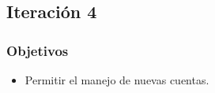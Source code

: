 %
%

\subsection{Iteración 4}
\subsubsection{Objetivos}
\begin{itemize}
\item Permitir el manejo de nuevas cuentas.
\end{itemize}

